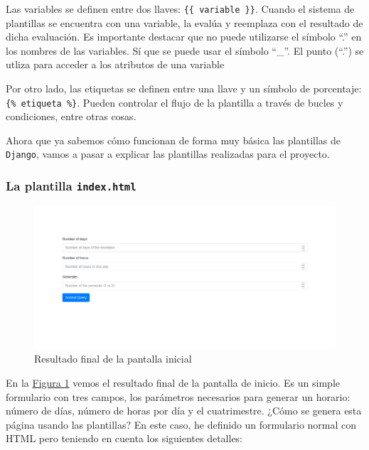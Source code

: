 Las variables se definen entre dos llaves: \texttt{\{\{ variable \}\}}. Cuando el sistema de plantillas se encuentra con una variable, la evalúa y reemplaza con el resultado de dicha evaluación. Es importante destacar que no puede utilizarse el símbolo ``.'' en los nombres de las variables. Sí que se puede usar el símbolo ``\_''. El punto (``.'') se utliza para acceder a los atributos de una variable 

Por otro lado, las etiquetas se definen entre una llave y un símbolo de porcentaje: \texttt{\{\% etiqueta \%\}}. Pueden controlar el flujo de la plantilla a través de bucles y condiciones, entre otras cosas.

Ahora que ya sabemos cómo funcionan de forma muy básica las plantillas de \texttt{Django}, vamos a pasar a explicar las plantillas realizadas para el proyecto.

\subsubsection{La plantilla \texttt{index.html}}
\begin{figure}
\centering
\includegraphics[width=\textwidth]{img/pantalla_inicial_final}
\caption{Resultado final de la pantalla inicial}
\label{pantallainicialfinal}
\end{figure}

En la \hyperref[pantallainicialfinal]{Figura \ref*{pantallainicialfinal}} vemos el resultado final de la pantalla de inicio. Es un simple formulario con tres campos, los parámetros necesarios para generar un horario: número de días, número de horas por día y el cuatrimestre. ¿Cómo se genera esta página usando las plantillas? En este caso, he definido un formulario normal con HTML pero teniendo en cuenta los siguientes detalles:

